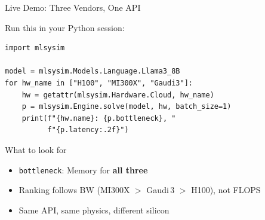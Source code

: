 \documentclass[aspectratio=169, 12pt]{beamer}
\begin{document}
\begin{frame}[fragile,shrink=10]{Live Demo: Three Vendors, One API}

\small
Run this in your Python session:

\begin{lstlisting}
import mlsysim

model = mlsysim.Models.Language.Llama3_8B
for hw_name in ["H100", "MI300X", "Gaudi3"]:
    hw = getattr(mlsysim.Hardware.Cloud, hw_name)
    p = mlsysim.Engine.solve(model, hw, batch_size=1)
    print(f"{hw.name}: {p.bottleneck}, "
          f"{p.latency:.2f}")
\end{lstlisting}

\vspace{0.2cm}
\begin{exampleblock}{What to look for}
  \begin{itemize}
    \item \texttt{bottleneck}: Memory for \textbf{all three}
    \item Ranking follows BW (MI300X $>$ Gaudi\,3 $>$ H100), not FLOPS
    \item Same API, same physics, different silicon
  \end{itemize}
\end{exampleblock}
\end{frame}
\end{document}
